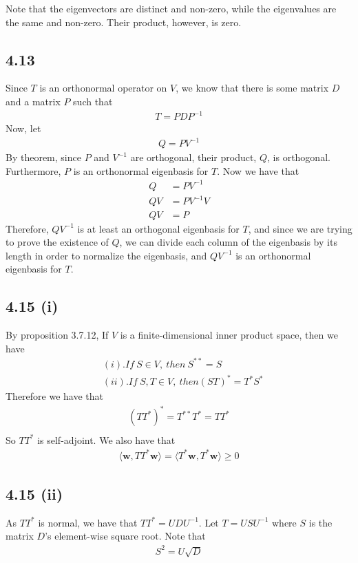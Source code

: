 \documentclass[letterpaper,12pt]{article}
\theoremstyle{definition}
\begin{document}
Note that the eigenvectors are distinct and non-zero, while the eigenvalues are the same and non-zero. Their product, however, is zero.


\subsection*{4.13}

Since $T$ is an orthonormal operator on $V$, we know that there is some matrix $D$ and a matrix $P$ such that 
\begin{align*}
T = PDP^{-1}
\end{align*}
Now, let 
\begin{align*}
Q = PV^{-1}
\end{align*}
By theorem, since $P$ and $V^{-1}$ are orthogonal, their product, $Q$, is orthogonal. Furthermore, $P$ is an orthonormal eigenbasis for $T$. Now we have that
\begin{align*}
Q &= PV^{-1}\\
QV &= PV^{-1}V\\
QV &= P
\end{align*}
Therefore, $QV^{-1}$ is at least an orthogonal eigenbasis for $T$, and since we are trying to prove the existence of $Q$, we can divide each column of the eigenbasis by its length in order to normalize the eigenbasis, and $QV^{-1}$ is an orthonormal eigenbasis for $T$.


\subsection*{4.15 (i)}
By proposition 3.7.12, If $V$ is a finite-dimensional inner product space, then we have
\begin{align*}
&(i). If ~S \in V,~ then~ S^{**} = S\\
&(ii). If ~S,T \in V, ~then (ST)^* = T^*S^*
\end{align*}
Therefore we have that 
\begin{align*}
(TT^*)^* = T^{**}T^* = TT^* \\
\end{align*}
So $TT^*$ is self-adjoint. We also have that
\begin{align*}
\langle \mathbf{w}, TT^* \mathbf{w} \rangle = \langle T^* \mathbf{w}, T^* \mathbf{w} \rangle \geq 0
\end{align*}


\subsection*{4.15 (ii)}
As $TT^*$ is normal, we have that $TT^* = UDU^{-1}$. Let $T = USU^{-1}$ where $S$ is the matrix $D$'s element-wise square root. Note that
\begin{align*}
S^2 = U\sqrt{D}
    
\end{align*}
\end{document}
